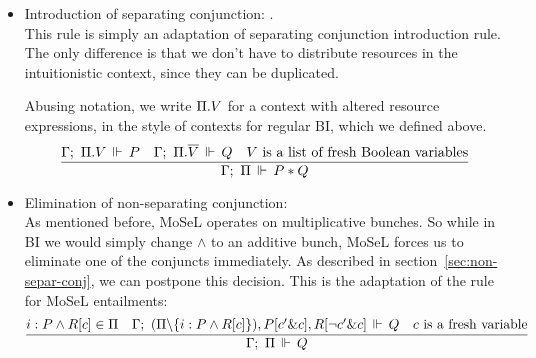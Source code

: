 \begin{itemize}
\item Introduction of separating conjunction: .\\
  This rule is simply an adaptation of separating conjunction introduction rule.
  The only difference is that we don't have to distribute resources in the intuitionistic context, since they can be duplicated.

  Abusing notation, we write \(\Pi . V\) for a context with altered resource expressions, in the style of contexts for regular BI, which we defined above.
  \[
    \infer{\entailsD P * Q}
          {\entails {\IntuD} {\SpatD . V} P &
           \entails {\IntuD} {\SpatD . \overline{V}} Q &
           V \text{ is a list of fresh Boolean variables}}
   \]
 \item Elimination of non-separating conjunction: \\
   As mentioned before, MoSeL operates on multiplicative bunches.
   So while in BI we would simply change \(\wedge\) to an additive bunch, MoSeL forces us to eliminate one of the conjuncts immediately.
   As described in section~\ref{sec:non-separ-conj}, we can postpone this decision.
   This is the adaptation of the rule for MoSeL entailments:
  \[
  \infer{\entailsD Q}
        {i : P \wedge R[c] \in \SpatD &
         \entails {\IntuD}
                  {(\SpatD \backslash \{i : P \wedge R[c]\}), P[c' \& c], R [\neg c' \& c]}
                  {Q} &
         c \text{ is a fresh variable}}
  \]





\end{itemize}
